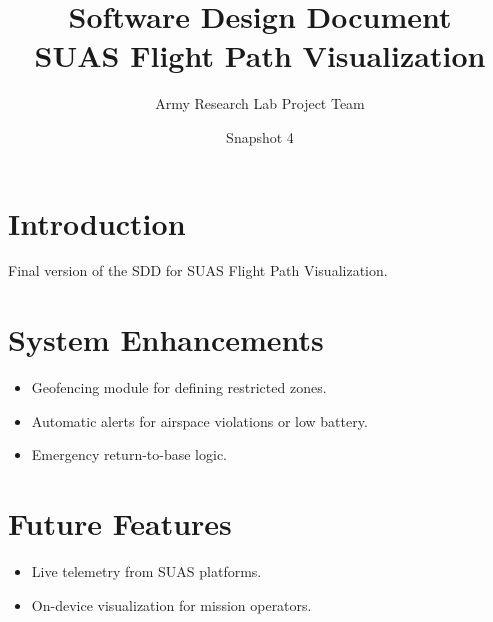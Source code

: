 \documentclass[12pt]{article}
\title{Software Design Document\\SUAS Flight Path Visualization}
\author{Army Research Lab Project Team}
\date{Snapshot 4}
\begin{document}
\maketitle

\tableofcontents
\newpage

\section{Introduction}
Final version of the SDD for SUAS Flight Path Visualization.

\section{System Enhancements}
\begin{itemize}
  \item Geofencing module for defining restricted zones.
  \item Automatic alerts for airspace violations or low battery.
  \item Emergency return-to-base logic.
\end{itemize}

\section{Future Features}
\begin{itemize}
  \item Live telemetry from SUAS platforms.
  \item On-device visualization for mission operators.
\end{itemize}
\end{document}
